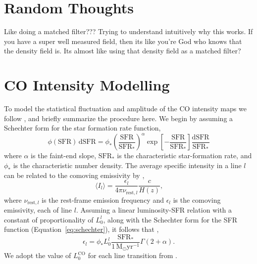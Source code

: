 \documentclass{aastex62}
\newcommand{\Msun}{\ensuremath{\text{M}_\odot}}
\newcommand{\SFR}{\ensuremath{\text{SFR}}}
\newcommand{\MHz}{\ensuremath{\text{MHz}}}
\newcommand{\CO}{\ensuremath{\text{CO}}}
\newcommand{\beq}{\begin{equation}}
\newcommand{\eeq}{\end{equation}}
\newcommand{\avg}[1]{\ensuremath{\langle #1 \rangle}}
\newcommand{\SN}{\ensuremath{\text{S}/\text{N}}}
\begin{document}

\section{Random Thoughts}
Like doing a matched filter??? Trying to understand intuitively why this
works. If you have a super well measured field, then its like you're God who
knows that the density field is. Its almost like using that density field as a
matched filter?

\appendix
\section{CO Intensity Modelling} \label{app:co_int}
To model the statistical fluctuation and amplitude of the \CO{} intensity maps
we follow \citet{2016ApJ...825..143L}, and briefly summarize the procedure
here. We begin by assuming a Schechter form for the star formation rate
function,
\beq\label{eq:schechter}
\phi(\SFR)\,\text{d}\SFR = \phi_*
\left(\frac{\SFR}{\SFR_*}\right)^{\alpha}\exp{\left[-\frac{\SFR}{\SFR_*}\right]}
\frac{\text{d}\SFR}{\SFR_*}
\eeq
where $\alpha$ is the faint-end slope, $\SFR_*$ is the characteristic
star-formation rate, and $\phi_*$ is the characteristic number density. The
average specific intensity in a line $l$ can be related to the comoving
emissivity by \citep{2011ApJ...741...70L, 2013ApJ...768...15P},
\beq\label{eq:emiss_to_int}
\avg{I_l} = \frac{\epsilon_l}{4\pi \nu_{\text{rest},l}}\frac{c}{H(z)}\text{,}
\eeq
where $\nu_{\text{rest},l}$ is the rest-frame emission frequency and
$\epsilon_l$ is the comoving emissivity, each of line $l$. Assuming a linear
luminosity-SFR relation with a constant of proportionality of $L_0^l$, along
with the Schechter form for the SFR function (Equation~\ref{eq:schechter}), it
follows that \citep{2013ApJ...768...15P},
\beq\label{eq:com_emiss}
\epsilon_l = \phi_* L_0^{l}
\frac{\SFR_*}{1\,\Msun\text{yr}^{-1}}\Gamma{(2+\alpha)}\text{.}
\eeq
We adopt the value of $L_0^{\CO}$ for each line transition from
\citet{2010JCAP...11..016V}.



\end{document}
